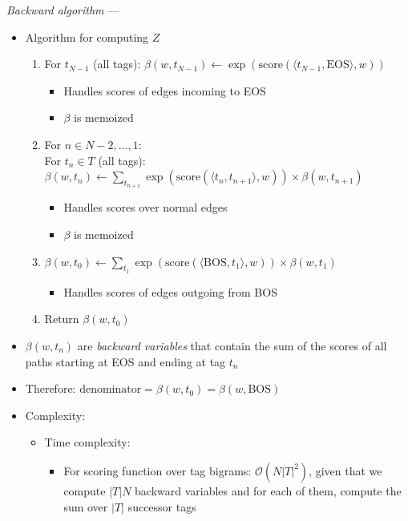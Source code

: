 \emph{Backward algorithm} --- 
\begin{itemize}
    \item Algorithm for computing $Z$
    \begin{enumerate}
        \item For $t_{N-1}$ (all tags):
        $
        \beta(w, t_{N-1}) \gets \exp(\textrm{score}(\langle t_{N-1}, \textrm{EOS} \rangle, w))
        $
        \begin{itemize}
            \item Handles scores of edges incoming to EOS
            \item $\beta$ is memoized
        \end{itemize}
        \item For $n \in N-2, \dots, 1$:\\
        For $t_n \in T$ (all tags):
        $
        \beta(w, t_n) \gets \sum_{t_{n+1}} \exp(\textrm{score}(\langle t_n, t_{n+1} \rangle, w)) \times \beta(w, t_{n+1})
        $
        \begin{itemize}
            \item Handles scores over normal edges
            \item $\beta$ is memoized
        \end{itemize}
        \item 
        $
        \beta(w, t_0) \gets \sum_{t_1} \exp(\textrm{score}(\langle \textrm{BOS}, t_1 \rangle, w)) \times \beta(w, t_1)
        $
        \begin{itemize}
            \item Handles scores of edges outgoing from BOS
        \end{itemize}
        \item Return $\beta(w, t_0)$
    \end{enumerate}
    \item $\beta(w, t_n)$ are \emph{backward variables} that contain the sum of the scores of all paths starting at EOS and ending at tag $t_n$
    \item Therefore:
    $
    \textrm{denominator} = \beta(w, t_0) = \beta(w, \textrm{BOS})
    $
    \item Complexity:
    \begin{itemize}
        \item Time complexity: 
        \begin{itemize}
            \item For scoring function over tag bigrams: $\mathcal{O}(N |T|^2)$, given that we compute $|T| N$ backward variables and for each of them, compute the sum over $|T|$ successor tags

\end{itemize}
\end{itemize}
\end{itemize}
